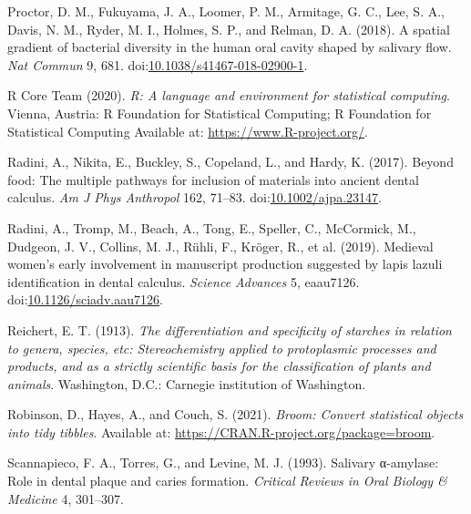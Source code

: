 \documentclass[utf8]{../templates/frontiersSCNS}
\newlength{\cslhangindent}
\newlength{\cslentryspacingunit} %
\newenvironment{CSLReferences}[2] %
 {%
  \setlength{\parindent}{0pt}
  \ifodd #1
  \let\oldpar\par
  \def\par{\hangindent=\cslhangindent\oldpar}
  \fi
  \setlength{\parskip}{#2\cslentryspacingunit}
 }%
 {}
\begin{document}
\begin{CSLReferences}{1}{0}
\leavevmode{}%
Proctor, D. M., Fukuyama, J. A., Loomer, P. M., Armitage, G. C., Lee, S. A., Davis, N. M., Ryder, M. I., Holmes, S. P., and Relman, D. A. (2018). A spatial gradient of bacterial diversity in the human oral cavity shaped by salivary flow. \emph{Nat Commun} 9, 681. doi:\href{https://doi.org/10.1038/s41467-018-02900-1}{10.1038/s41467-018-02900-1}.

\leavevmode{}%
R Core Team (2020). \emph{R: {A} language and environment for statistical computing}. {Vienna, Austria}: {R Foundation for Statistical Computing}; {R Foundation for Statistical Computing} Available at: \url{https://www.R-project.org/}.

\leavevmode{}%
Radini, A., Nikita, E., Buckley, S., Copeland, L., and Hardy, K. (2017). Beyond food: {The} multiple pathways for inclusion of materials into ancient dental calculus. \emph{Am J Phys Anthropol} 162, 71--83. doi:\href{https://doi.org/10.1002/ajpa.23147}{10.1002/ajpa.23147}.

\leavevmode{}%
Radini, A., Tromp, M., Beach, A., Tong, E., Speller, C., McCormick, M., Dudgeon, J. V., Collins, M. J., Rühli, F., Kröger, R., et al. (2019). Medieval women's early involvement in manuscript production suggested by lapis lazuli identification in dental calculus. \emph{Science Advances} 5, eaau7126. doi:\href{https://doi.org/10.1126/sciadv.aau7126}{10.1126/sciadv.aau7126}.

\leavevmode{}%
Reichert, E. T. (1913). \emph{The differentiation and specificity of starches in relation to genera, species, etc: Stereochemistry applied to protoplasmic processes and products, and as a strictly scientific basis for the classification of plants and animals}. {Washington, D.C.}: {Carnegie institution of Washington}.

\leavevmode{}%
Robinson, D., Hayes, A., and Couch, S. (2021). \emph{Broom: {Convert} statistical objects into tidy tibbles}. Available at: \url{https://CRAN.R-project.org/package=broom}.

\leavevmode{}%
Scannapieco, F. A., Torres, G., and Levine, M. J. (1993). Salivary α-amylase: Role in dental plaque and caries formation. \emph{Critical Reviews in Oral Biology \& Medicine} 4, 301--307.


\end{CSLReferences}
\end{document}
